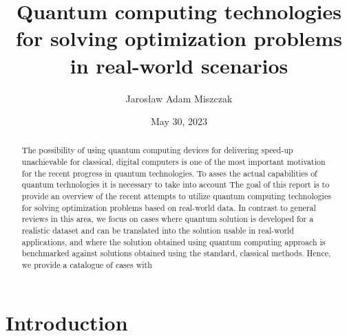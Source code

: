 \documentclass[a4paper,11pt]{article}
\newcommand{\docName}{report\xspace}
\begin{document}

\title{Quantum computing technologies for solving optimization problems in real-world scenarios}
\author{Jaros\l aw Adam Miszczak}
\date{May 30, 2023}

\maketitle

\begin{abstract}
The possibility of using quantum computing devices for delivering speed-up unachievable for classical, digital computers is one of the most important motivation for the recent progress in quantum technologies. To asses the actual capabilities of quantum technologies it is necessary to take into account
The goal of this \docName is to provide an overview of the recent attempts to utilize quantum computing technologies for solving optimization problems based on real-world data. In contrast to general reviews in this area, we focus on cases where quantum solution is developed for a realistic dataset and can be translated into the solution usable in real-world applications, and where  the solution obtained using quantum computing approach is benchmarked against solutions obtained using the standard, classical methods. Hence, we provide a catalogue of cases with  

\end{abstract}

%

\section{Introduction}
\end{document}
